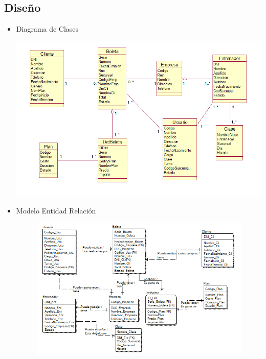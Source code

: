 \subsection{Diseño}
\begin{itemize}
	\item Diagrama de Clases
\begin{center}
	\includegraphics[width=15cm]{./Imagenes/DiagramaClases}
\end{center}
	\item Modelo Entidad Relación
\begin{figure}[H]
		\begin{center}
			\includegraphics[width=17cm]{./Imagenes/EntidadRelacion}
		\end{center}
	\end{figure}
\end{itemize}



